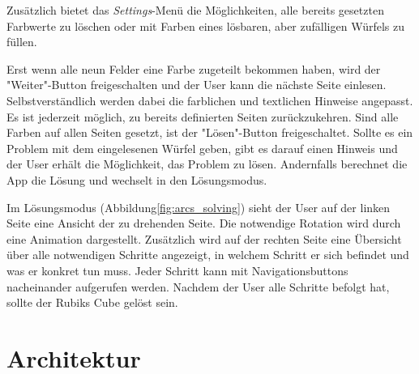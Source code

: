 Zusätzlich bietet das \emph{Settings}-Menü die Möglichkeiten, alle bereits
gesetzten Farbwerte zu löschen oder mit Farben eines lösbaren, aber zufälligen
Würfels zu füllen.

Erst wenn alle neun Felder eine Farbe zugeteilt bekommen haben, wird der
"Weiter"-Button freigeschalten und der User kann die nächste Seite einlesen.
Selbstverständlich werden dabei die farblichen und textlichen Hinweise
angepasst. Es ist jederzeit möglich, zu bereits definierten Seiten
zurückzukehren. Sind alle Farben auf allen Seiten gesetzt, ist der
"Lösen"-Button freigeschaltet. Sollte es ein Problem mit dem eingelesenen Würfel
geben, gibt es darauf einen Hinweis und der User erhält die Möglichkeit, das
Problem zu lösen. Andernfalls berechnet die App die Lösung und wechselt in den
Lösungsmodus.

Im Lösungsmodus (Abbildung\ref{fig:arcs_solving}) sieht der User auf der linken
Seite eine Ansicht der zu drehenden Seite. Die notwendige Rotation wird durch
eine Animation dargestellt. Zusätzlich wird auf der rechten Seite eine Übersicht
über alle notwendigen Schritte angezeigt, in welchem Schritt er sich befindet
und was er konkret tun muss. Jeder Schritt kann mit Navigationsbuttons
nacheinander aufgerufen werden. Nachdem der User alle Schritte befolgt hat,
sollte der Rubiks Cube gelöst sein.

\section{Architektur}  %

